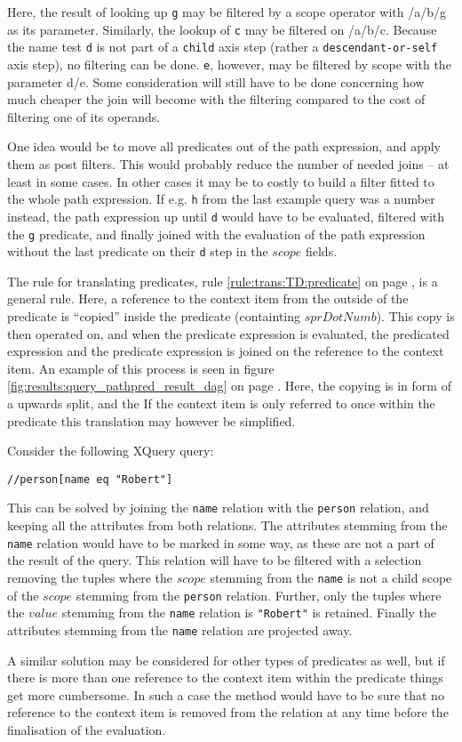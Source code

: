 Here, the result of looking up \texttt{g} may be filtered by a \textsf{scope} operator with \textsf{/a/b/g} as its
parameter. Similarly, the lookup of \texttt{c} may be filtered on \textsf{/a/b/c}. Because the name test \texttt{d}
is not part of a \texttt{child} axis step (rather a \texttt{descendant-or-self} axis step), no filtering can be
done. \texttt{e}, however, may be filtered by \textsf{scope} with the parameter \textsf{d/e}. Some consideration
will still have to be done concerning how much cheaper the join will become with the filtering compared to the cost
of filtering one of its operands.

One idea would be to move all predicates out of the path expression, and apply them as post filters. This would
probably reduce the number of needed joins -- at least in some cases. In other cases it may be to costly to build
a filter fitted to the whole path expression. If e.g. \texttt{h} from the last example query was a number instead,
the path expression up until \texttt{d} would have to be evaluated, filtered with the \texttt{g} predicate, and
finally joined with the evaluation of the path expression without the last predicate on their \texttt{d} step in
the $scope$ fields.

The rule for translating predicates, rule \ref{rule:trans:TD:predicate} on page \pageref{rule:trans:TD:predicate},
is a general rule. Here, a reference to the context item from the outside of the predicate is ``copied'' inside the
predicate (containting $sprDotNumb$). This copy is then operated on, and when the predicate expression is
evaluated, the predicated expression and the predicate expression is joined on the reference to the context item.
An example of this process is seen in figure \ref{fig:results:query_pathpred_result_dag} on page
\pageref{fig:results:query_pathpred_result_dag}. Here, the copying is in form of a upwards split, and the If the
context item is only referred to once within the predicate this translation may however be simplified.

Consider the following XQuery query:
\begin{center}
\texttt{//person[name eq "Robert"]}
\end{center}

This can be solved by joining the \texttt{name} relation with the \texttt{person} relation, and keeping all the
attributes from both relations. The attributes stemming from the \texttt{name} relation would have to be marked in
some way, as these are not a part of the result of the query. This relation will have to be filtered with a
selection removing the tuples where the $scope$ stemming from the \texttt{name} is not a child scope of the
$scope$ stemming from the \texttt{person} relation. Further, only the tuples where the $value$ stemming from the
\texttt{name} relation is \texttt{"Robert"} is retained. Finally the attributes stemming from the \texttt{name}
relation are projected away.

A similar solution may be considered for other types of predicates as well, but if there is more than one
reference to the context item within the predicate things get more cumbersome. In such a case the method would
have to be sure that no reference to the context item is removed from the relation at any time before the
finalisation of the evaluation.